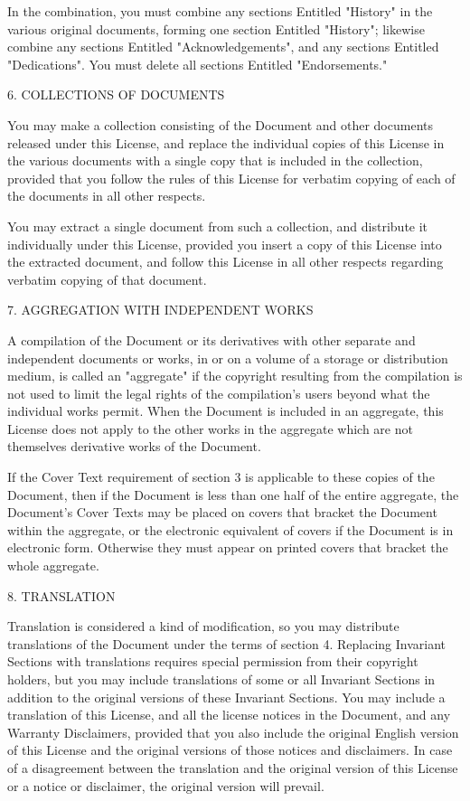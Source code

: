 \documentclass[oneside,english,a4paper,10pt,oneside,openany,final]{memoir}
\begin{document}
In the combination, you must combine any sections Entitled "History" in the various original documents, forming one section Entitled "History"; likewise combine any sections Entitled "Acknowledgements", and any sections Entitled "Dedications". You must delete all sections Entitled "Endorsements."

6. COLLECTIONS OF DOCUMENTS

You may make a collection consisting of the Document and other documents released under this License, and replace the individual copies of this License in the various documents with a single copy that is included in the collection, provided that you follow the rules of this License for verbatim copying of each of the documents in all other respects.

You may extract a single document from such a collection, and distribute it individually under this License, provided you insert a copy of this License into the extracted document, and follow this License in all other respects regarding verbatim copying of that document.

7. AGGREGATION WITH INDEPENDENT WORKS

A compilation of the Document or its derivatives with other separate and independent documents or works, in or on a volume of a storage or distribution medium, is called an "aggregate" if the copyright resulting from the compilation is not used to limit the legal rights of the compilation's users beyond what the individual works permit. When the Document is included in an aggregate, this License does not apply to the other works in the aggregate which are not themselves derivative works of the Document.

If the Cover Text requirement of section 3 is applicable to these copies of the Document, then if the Document is less than one half of the entire aggregate, the Document's Cover Texts may be placed on covers that bracket the Document within the aggregate, or the electronic equivalent of covers if the Document is in electronic form. Otherwise they must appear on printed covers that bracket the whole aggregate.

8. TRANSLATION

Translation is considered a kind of modification, so you may distribute translations of the Document under the terms of section 4. Replacing Invariant Sections with translations requires special permission from their copyright holders, but you may include translations of some or all Invariant Sections in addition to the original versions of these Invariant Sections. You may include a translation of this License, and all the license notices in the Document, and any Warranty Disclaimers, provided that you also include the original English version of this License and the original versions of those notices and disclaimers. In case of a disagreement between the translation and the original version of this License or a notice or disclaimer, the original version will prevail.
\end{document}
